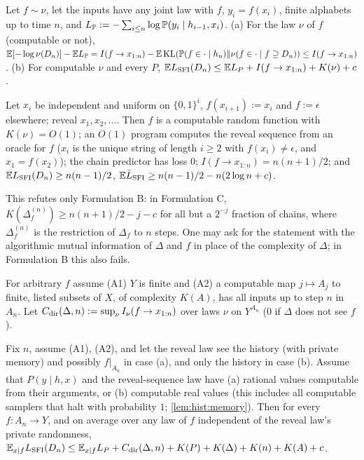 \begin{theorem}\label{thm:hist:directed}
Let $f\sim\nu$, let the inputs have any joint law with $f$, $y_i=f(x_i)$, finite alphabets up to time $n$, and $L_{\mathbb{P}}:=-\sum_{i\le n}\log\mathbb{P}(y_i\mid h_{i-1},x_i)$. (a) For the law $\nu$ of $f$ (computable or not), $\mathbb{E}[-\log\nu(D_n)]-\mathbb{E} L_{\mathbb{P}}=I(f\to x_{1:n})-\mathbb{E}\operatorname{KL}(\mathbb{P}(f\in\cdot\mid h_n)\Vert\nu(f\in\cdot\mid f\supseteq D_n))\le I(f\to x_{1:n})$. (b) For computable $\nu$ and every $P$, $\mathbb{E}L_{\mathrm{SFI}}(D_n)\le\mathbb{E} L_P+I(f\to x_{1:n})+K(\nu)+c$.
\end{theorem}

\begin{theorem}\label{thm:hist:randchain}
Let $x_i$ be independent and uniform on $\{0,1\}^i$, $f(x_{i+1}):=x_i$ and $f:=\epsilon$ elsewhere; reveal $x_1,x_2,\dots$. Then $f$ is a computable random function with $K(\nu)=O(1)$; an $O(1)$ program computes the reveal sequence from an oracle for $f$ ($x_i$ is the unique string of length $i\ge2$ with $f(x_i)\ne\epsilon$, and $x_1=f(x_2)$); the chain predictor has loss $0$; $I(f\to x_{1:n})=n(n+1)/2$; and $\mathbb{E}L_{\mathrm{SFI}}(D_n)\ge n(n-1)/2$, $\mathbb{E}\bar{L}_{\mathrm{SFI}}\ge n(n-1)/2-n(2\log n+c)$.
\end{theorem}

This refutes only Formulation B: in Formulation C, $K(\Delta^{(n)}_f)\ge n(n+1)/2-j-c$ for all but a $2^{-j}$ fraction of chains, where $\Delta^{(n)}_f$ is the restriction of $\Delta_f$ to $n$ steps. One may ask for the statement with the algorithmic mutual information of $\Delta$ and $f$ in place of the complexity of $\Delta$; in Formulation B this also fails.

For arbitrary $f$ assume (A1) $Y$ is finite and (A2) a computable map $j\mapsto A_j$ to finite, listed subsets of $X$, of complexity $K(A)$, has all inputs up to step $n$ in $A_n$. Let $C_{\rm dir}(\Delta,n):=\sup_\nu I_\nu(f\to x_{1:n})$ over laws $\nu$ on $Y^{A_n}$ ($0$ if $\Delta$ does not see $f$).

\begin{theorem}\label{thm:hist:minimax}
Fix $n$, assume (A1), (A2), and let the reveal law see the history (with private memory) and possibly $f|_{A_n}$ in case (a), and only the history in case (b). Assume that $P(y\mid h,x)$ and the reveal-sequence law have (a) rational values computable from their arguments, or (b) computable real values (this includes all computable samplers that halt with probability $1$; \cref{lem:hist:memory}). Then for every $f:A_n\to Y$, and on average over any law of $f$ independent of the reveal law's private randomness,
$\mathbb{E}_{x\mid f}L_{\mathrm{SFI}}(D_n)\le\mathbb{E}_{x\mid f}L_P+C_{\rm dir}(\Delta,n)+K(P)+K(\Delta)+K(n)+K(A)+c$.
\end{theorem}

